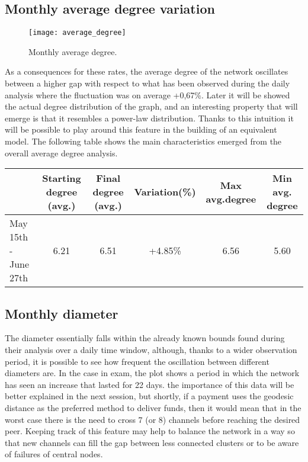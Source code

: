 	\subsection{Monthly average degree variation}
	
	\begin{figure}
		\centering
		\texttt{[image: average\_degree]}
		\caption{Monthly average degree.}
		\label{monthly_degree}
	\end{figure}
	
	As a consequences for these rates, the average degree of the network oscillates between a higher gap with respect to what has been observed during the daily analysis where the fluctuation was on average +0,67\%. Later it will be showed the actual degree distribution of the graph, and an interesting property that will emerge is that it resembles a power-law distribution. Thanks to this intuition it will be possible to play around this feature in the building of an equivalent model. The following table shows the main characteristics emerged from the overall average degree analysis.
	
	\begin{center}
		\begin{tabulary}{\linewidth}{| L | C | C | C | C | C |}
			\hline	
			& Starting degree (avg.) & Final degree (avg.)  & Variation(\%) & Max avg.degree & Min avg. degree \\ \hline
			May 15th - June 27th & 6.21 & 6.51 & +4.85\% & 6.56 & 5.60 \\ \hline
		\end{tabulary}
	\end{center}
	
	\subsection{Monthly diameter}
	
	The diameter essentially falls within the already known bounds found during their analysis over a daily time window, although, thanks to a wider observation period, it is possible to see how frequent the oscillation between different diameters are. In the case in exam, the plot shows a period in which the network has seen an increase that lasted for 22 days. the importance of this data will be better explained in the next session, but shortly, if a payment uses the geodesic distance as the preferred method to deliver funds, then it would mean that in the worst case there is the need to cross 7 (or 8) channels before reaching the desired peer. Keeping track of this feature may help to balance the network in a way so that new channels can fill the gap between less connected clusters or to be aware of failures of central nodes.
	
